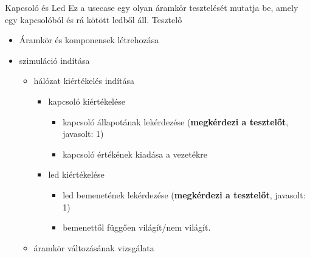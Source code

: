 \usecase
{Kapcsoló és Led}
{Ez a usecase egy olyan áramkör tesztelését mutatja be, amely egy kapcsolóból és rá kötött ledből áll.}
{Tesztelő}
{\vspace{-15pt}
\begin{itemize}
\setlength{\itemsep}{0cm}%
\setlength{\parskip}{0cm}%
\item Áramkör és komponensek létrehozása
\item szimuláció indítása
\begin{itemize}
\setlength{\itemsep}{0cm}%
\setlength{\parskip}{0cm}%
\item hálózat kiértékelés indítása
\begin{itemize}
\setlength{\itemsep}{0cm}%
\setlength{\parskip}{0cm}%
	\item kapcsoló kiértékelése
	\begin{itemize}
	\setlength{\itemsep}{0cm}%
	\setlength{\parskip}{0cm}%
		\item kapcsoló állapotának lekérdezése (\textbf{megkérdezi a tesztelőt}, javasolt: 1)
		\item kapcsoló értékének kiadása a vezetékre
	\end{itemize}
	\item led kiértékelése
	\begin{itemize}
	\setlength{\itemsep}{0cm}%
	\setlength{\parskip}{0cm}%
		\item led bemenetének lekérdezése (\textbf{megkérdezi a tesztelőt}, javasolt: 1)
		\item bemenettől függően világít/nem világít.
	\end{itemize}
\end{itemize}
\item áramkör változásának vizsgálata

\end{itemize}
\end{itemize}}
